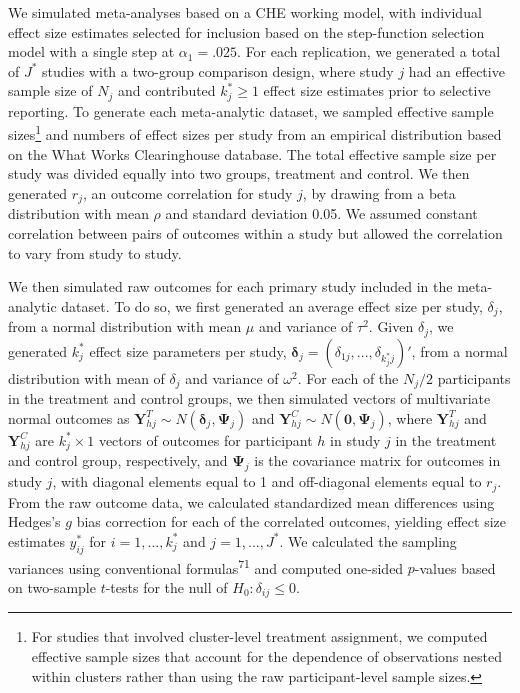 \documentclass[
  american,
  man, donotrepeattitle,floatsintext]{apa7}
\begin{document}
We simulated meta-analyses based on a CHE working model, with individual effect size estimates selected
for inclusion based on the step-function selection model with a single step at \(\alpha_1 = .025\).
For each replication, we generated a total of \(J^*\) studies with a two-group comparison
design, where study \(j\) had an effective sample size of \(N_j\) and contributed \(k_j^* \geq 1\) effect size estimates prior to selective reporting.
To generate each meta-analytic dataset, we sampled effective sample sizes\footnote{For studies that involved cluster-level treatment assignment, we computed effective sample sizes that account for the dependence of observations nested within clusters rather than using the raw participant-level sample sizes.} and numbers of effect sizes per study from an empirical distribution based on the What Works Clearinghouse database.
The total effective sample size per study was divided equally into two groups, treatment and control.
We then generated \(r_j\), an outcome correlation for study \(j\), by drawing from a beta distribution with mean \(\rho\) and standard deviation 0.05.
We assumed constant correlation between pairs of outcomes within a study but allowed the correlation to vary from study to study.

We then simulated raw outcomes for each primary study included in the
meta-analytic dataset. To do so, we first generated an average effect
size per study, \(\delta_j\), from a normal distribution with mean \(\mu\) and variance
of \(\tau^2\). Given \(\delta_j\), we generated \(k_j^*\) effect size parameters per study, \(\boldsymbol\delta_j = \left(\delta_{1j},...,\delta_{k_j^* j}\right)'\), from a normal distribution with mean of \(\delta_j\) and
variance of \(\omega^2\).
For each of the \(N_j / 2\) participants in the treatment and control groups, we then simulated vectors of multivariate normal outcomes as \(\mathbf{Y}_{hj}^T \sim N(\boldsymbol\delta_j, \boldsymbol\Psi_j)\) and \(\mathbf{Y}_{hj}^C \sim N(\mathbf{0}, \boldsymbol\Psi_j)\), where \(\mathbf{Y}_{hj}^T\) and \(\mathbf{Y}_{hj}^C\) are
\(k_j^* \times 1\) vectors of outcomes for participant \(h\) in study \(j\) in the treatment and control group, respectively, and \(\boldsymbol\Psi_j\) is the covariance matrix for outcomes in study \(j\), with diagonal elements equal to 1 and off-diagonal elements equal to \(r_j\).
From the raw outcome data, we calculated standardized mean
differences using Hedges's \(g\) bias correction for each of the correlated outcomes, yielding effect size estimates \(y^*_{ij}\) for \(i=1,...,k_j^*\) and \(j = 1,...,J^*\).
We calculated the sampling variances using conventional formulas\textsuperscript{71} and computed one-sided \(p\)-values based on two-sample \(t\)-tests for the null of \(H_0: \delta_{ij} \leq 0\).
\end{document}

